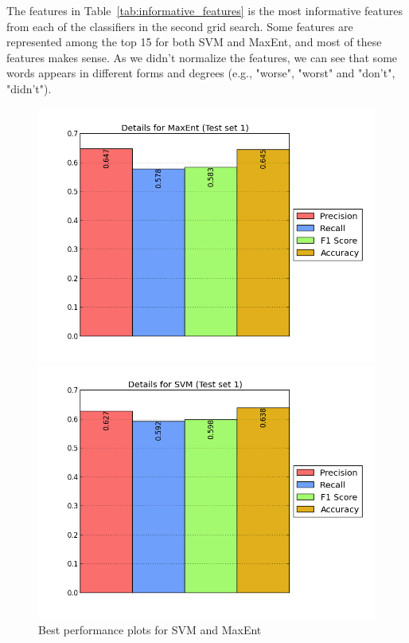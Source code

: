 The features in Table~\ref{tab:informative_features} is the most informative features from each of the classifiers in the second grid search. Some features are represented among the top 15 for both SVM and MaxEnt, and most of these features makes sense. As we didn't normalize the features, we can see that some words appears in different forms and degrees (e.g., "worse", "worst" and "don't", "didn't").


\begin{figure}[htb]
	\centering
	\begin{minipage}{.45\linewidth}
		\includegraphics[width=\linewidth]{../img/plots/analysis/maxent_stats_best.png}
	\end{minipage}
	\hspace{0.05\linewidth}
	\begin{minipage}{.45\linewidth}
		\includegraphics[width=\linewidth]{../img/plots/analysis/svm_stats_best.png}
	\end{minipage}
	\caption[Best performance plots for SVM and MaxEnt]{Best performance plots for SVM and MaxEnt}
	\label{fig:best_result}
\end{figure}

